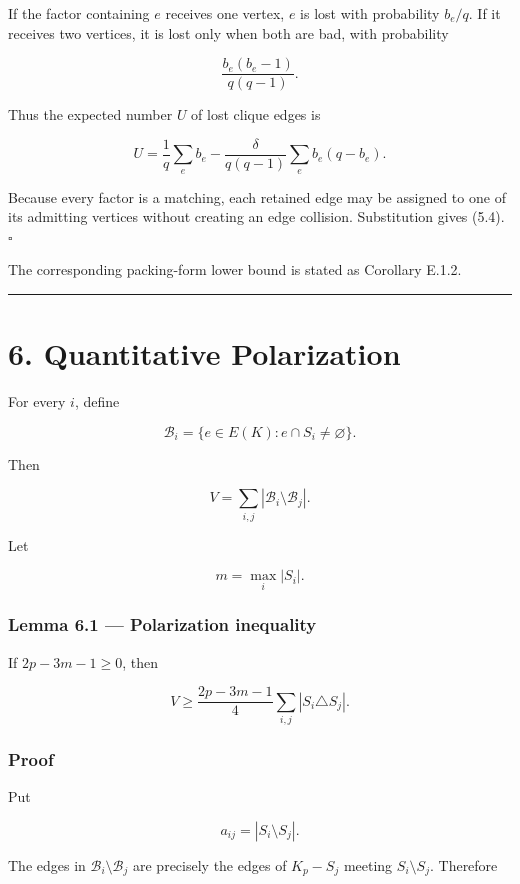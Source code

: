\documentclass[
  american,
  11pt,
  a4paper,
]{article}
\begin{document}
If the factor containing \(e\) receives one vertex, \(e\) is lost with probability \(b_e/q\). If it receives two vertices, it is lost only when both are bad, with probability

\[
\frac{b_e(b_e-1)}{q(q-1)}.
\]

Thus the expected number \(U\) of lost clique edges is

\[
U
=
\frac1q\sum_e b_e
-
\frac{\delta}{q(q-1)}\sum_e b_e(q-b_e).
\]

Because every factor is a matching, each retained edge may be assigned to one of its admitting vertices without creating an edge collision. Substitution gives (5.4). \(\square\)

The corresponding packing-form lower bound is stated as Corollary E.1.2.

\begin{center}\rule{0.5\linewidth}{0.5pt}\end{center}

\section{6. Quantitative Polarization}\label{quantitative-polarization}

For every \(i\), define

\[
\mathcal B_i=\{e\in E(K):e\cap S_i\ne\varnothing\}.
\]

Then

\[
V=\sum_{i,j}|\mathcal B_i\setminus\mathcal B_j|.
\tag{6.1}
\]

Let

\[
m=\max_i|S_i|.
\]

\subsubsection{Lemma 6.1 --- Polarization inequality}\label{lemma-6.1-polarization-inequality}

If \(2p-3m-1\ge0\), then

\[
\boxed{
V
\ge
\frac{2p-3m-1}{4}
\sum_{i,j}|S_i\triangle S_j|.
}
\tag{6.2}
\]

\subsubsection{Proof}\label{proof-5}

Put

\[
a_{ij}=|S_i\setminus S_j|.
\]

The edges in \(\mathcal B_i\setminus\mathcal B_j\) are precisely the edges of \(K_p-S_j\) meeting \(S_i\setminus S_j\). Therefore
\end{document}

